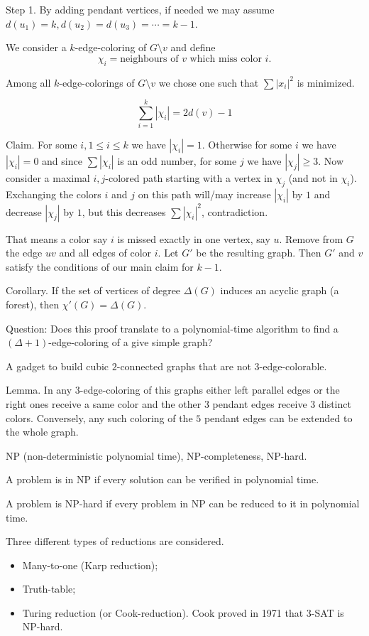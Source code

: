 \documentclass[12pt,a4paper]{article}
\begin{document}
Step 1. By adding pendant vertices, if needed we may assume \(d(u_1) = k, d(u_2)
= d(u_3) =\cdots = k - 1\).

We consider a \(k\)-edge-coloring of \(G \setminus v\) and define
\[\chi_i = {\text{neighbours of } v \text{ which miss color } i}.\]

Among all \(k\)-edge-colorings of \(G\setminus v\) we chose one such that
\(\sum{|x_i|}^2\) is minimized.

\[\sum_{i=1}^k|\chi_i| = 2d(v)-1\]

Claim. For some \(i, 1 \leq i \leq k\) we have \(|\chi_i| = 1\). Otherwise for
some \(i\) we have \(|\chi_i| = 0\) and since \(\sum|\chi_i|\) is an odd number,
for some \(j\) we have \(|\chi_j| \geq 3\). Now consider a maximal
\({i, j}\)-colored path starting with a vertex in \(\chi_j\) (and not in
\(\chi_i\)).  Exchanging the colors \(i\) and \(j\) on this path will/may
increase \(|\chi_i|\) by \(1\) and decrease \(|\chi_j|\) by \(1\), but this
decreases \(\sum{|\chi_i|}^2\), contradiction.

That means a color say \(i\) is missed exactly in one vertex, say \(u\). Remove
from \(G\) the edge \(u v\) and all edges of color \(i\). Let \(G'\) be the
resulting graph. Then \(G'\) and \(v\) satisfy the conditions of our main claim
for \(k-1\).

Corollary. If the set of vertices of degree \(\Delta(G)\) induces an acyclic
graph (a forest), then \(\chi'(G) = \Delta(G)\).

Question: Does this proof translate to a polynomial-time algorithm to find a
\((\Delta + 1)\)-edge-coloring of a give simple graph?

A gadget to build cubic \(2\)-connected graphs that are not
\(3\)-edge-colorable.

Lemma. In any \(3\)-edge-coloring of this graphs either left parallel edges or
the right ones receive a same color and the other \(3\) pendant edges receive
\(3\) distinct colors. Conversely, any such coloring of the \(5\) pendant edges
can be extended to the whole graph.

NP (non-deterministic polynomial time), NP-completeness, NP-hard.

A problem is in NP if every solution can be verified in polynomial time.

A problem is NP-hard if every problem in NP can be reduced to it in polynomial
time.

Three different types of reductions are considered.
\begin{itemize}
\item Many-to-one (Karp reduction);
\item Truth-table;
\item Turing reduction (or Cook-reduction). Cook proved in 1971 that \(3\)-SAT
  is NP-hard.
\end{itemize}
\end{document}
